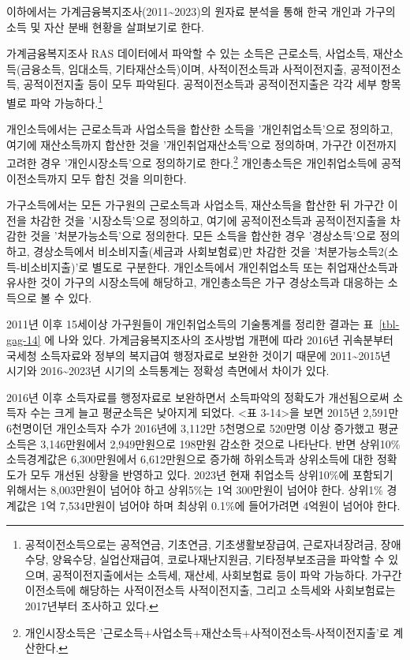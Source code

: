 \documentclass[
  letterpaper,
  DIV=11,
  numbers=noendperiod]{scrartcl}
\begin{document}
이하에서는 가계금융복지조사(2011\textasciitilde2023)의 원자료 분석을
통해 한국 개인과 가구의 소득 및 자산 분배 현황을 살펴보기로 한다.

가계금융복지조사 RAS 데이터에서 파악할 수 있는 소득은 근로소득,
사업소득, 재산소득(금융소득, 임대소득, 기타재산소득)이며, 사적이전소득과
사적이전지출, 공적이전소득, 공적이전지출 등이 모두 파악된다.
공적이전소득과 공적이전지출은 각각 세부 항목별로 파악
가능하다.\footnote{공적이전소득으로는 공적연금, 기초연금,
  기초생활보장급여, 근로자녀장려금, 장애수당, 양육수당, 실업산재급여,
  코로나재난지원금, 기타정부보조금을 파악할 수 있으며,
  공적이전지출에서는 소득세, 재산세, 사회보험료 등이 파악 가능하다.
  가구간 이전소득에 해당하는 사적이전소득 사적이전지출, 그리고 소득세와
  사회보험료는 2017년부터 조사하고 있다.}

개인소득에서는 근로소득과 사업소득을 합산한 소득을 '개인취업소득'으로
정의하고, 여기에 재산소득까지 합산한 것을 '개인취업재산소득'으로
정의하며, 가구간 이전까지 고려한 경우 '개인시장소득'으로 정의하기로
한다.\footnote{개인시장소득은
  '근로소득+사업소득+재산소득+사적이전소득-사적이전지출'로 계산한다.}
개인총소득은 개인취업소득에 공적이전소득까지 모두 합친 것을 의미한다.

가구소득에서는 모든 가구원의 근로소득과 사업소득, 재산소득을 합산한 뒤
가구간 이전을 차감한 것을 '시장소득'으로 정의하고, 여기에 공적이전소득과
공적이전지출을 차감한 것을 '처분가능소득'으로 정의한다. 모든 소득을
합산한 경우 '경상소득'으로 정의하고, 경상소득에서 비소비지출(세금과
사회보험료)만 차감한 것을 '처분가능소득2(소득-비소비지출)'로 별도로
구분한다. 개인소득에서 개인취업소득 또는 취업재산소득과 유사한 것이
가구의 시장소득에 해당하고, 개인총소득은 가구 경상소득과 대응하는
소득으로 볼 수 있다.

2011년 이후 15세이상 가구원들이 개인취업소득의 기술통계를 정리한 결과는
표~\ref{tbl-gag-14} 에 나와 있다. 가계금융복지조사의 조사방법 개편에
따라 2016년 귀속분부터 국세청 소득자료와 정부의 복지급여 행정자료로
보완한 것이기 때문에 2011\textasciitilde2015년 시기와
2016\textasciitilde2023년 시기의 소득통계는 정확성 측면에서 차이가 있다.

2016년 이후 소득자료를 행정자료로 보완하면서 소득파악의 정확도가
개선됨으로써 소득자 수는 크게 늘고 평균소득은 낮아지게 되었다.
\textless 표 3-14\textgreater 을 보면 2015년 2,591만 6천명이던
개인소득자 수가 2016년에 3,112만 5천명으로 520만명 이상 증가했고
평균소득은 3,146만원에서 2,949만원으로 198만원 감소한 것으로 나타난다.
반면 상위10\% 소득경계값은 6,300만원에서 6,612만원으로 증가해 하위소득과
상위소득에 대한 정확도가 모두 개선된 상황을 반영하고 있다. 2023년 현재
취업소득 상위10\%에 포함되기 위해서는 8,003만원이 넘어야 하고 상위5\%는
1억 300만원이 넘어야 한다. 상위1\% 경계값은 1억 7,534만원이 넘어야 하며
최상위 0.1\%에 들어가려면 4억원이 넘어야 한다.
\end{document}
